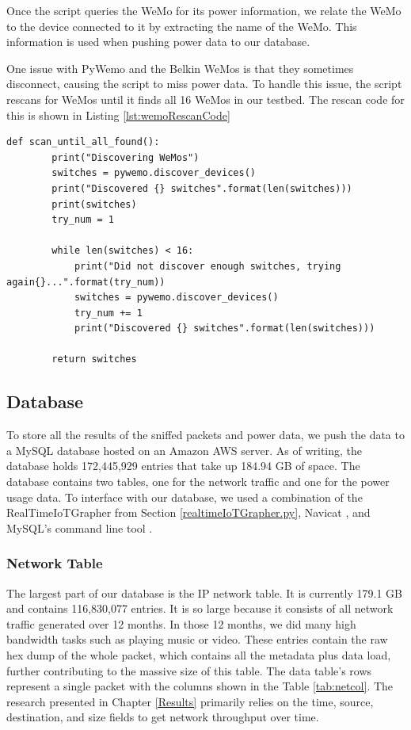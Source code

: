 Once the script queries the WeMo for its power information, we relate the WeMo to the device connected to it by extracting the name of the WeMo. This information is used when pushing power data to our database.

One issue with PyWemo and the Belkin WeMos is that they sometimes disconnect, causing the script to miss power data. To handle this issue, the script rescans for WeMos until it finds all 16 WeMos in our testbed. The rescan code for this is shown in Listing \ref{lst:wemoRescanCode}

\noindent
\begin{minipage}{\textwidth}
\begin{lstlisting}[label={lst:wemoRescanCode},caption={Rescan if all WeMos not found.}]
    def scan_until_all_found():
        print("Discovering WeMos")
        switches = pywemo.discover_devices()
        print("Discovered {} switches".format(len(switches)))
        print(switches)
        try_num = 1

        while len(switches) < 16:
            print("Did not discover enough switches, trying again{}...".format(try_num))
            switches = pywemo.discover_devices()
            try_num += 1
            print("Discovered {} switches".format(len(switches)))

        return switches
\end{lstlisting}
\end{minipage}

\subsection{Database}
\label{Database}

To store all the results of the sniffed packets and power data, we push the data to a MySQL database hosted on an Amazon AWS server. As of writing, the database holds 172,445,929 entries that take up 184.94 GB of space. The database contains two tables, one for the network traffic and one for the power usage data. To interface with our database, we used a combination of the RealTimeIoTGrapher from Section \ref{realtimeIoTGrapher.py}, Navicat \cite{navicat}, and MySQL’s command line tool \cite{mysqlCommandline}.

\subsubsection{Network Table}
\label{Network Table}
The largest part of our database is the IP network table. It is currently 179.1 GB and contains 116,830,077 entries. It is so large because it consists of all network traffic generated over 12 months. In those 12 months, we did many high bandwidth tasks such as playing music or video. These entries contain the raw hex dump of the whole packet, which contains all the metadata plus data load, further contributing to the massive size of this table. The data table's rows represent a single packet with the columns shown in the Table \ref{tab:netcol}. The research presented in Chapter \ref{Results} primarily relies on the time, source, destination, and size fields to get network throughput over time.


